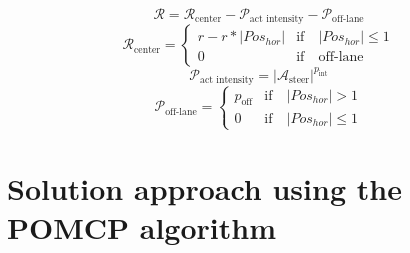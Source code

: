 

\begin{equation*}
    \mathcal{R} = \mathcal{R}_{\textrm{center}} - \mathcal{P}_{\textrm{act intensity}} - \mathcal{P}_{\textrm{off-lane}}
\end{equation*}
\begin{equation*}
    \mathcal{R}_{\textrm{center}} = 
    \begin{cases}
        r - r * |Pos_{hor}| & \text{if} \quad |Pos_{hor}| \leq 1 \\
        0 & \text{if} \quad \text{off-lane}
    \end{cases}
\end{equation*}
\begin{equation*}
    \mathcal{P}_{\textrm{act intensity}} = |\mathcal{A}_{\textrm{steer}}| ^ {p_{\textrm{int}}}
\end{equation*}
\begin{equation*}
    \mathcal{P}_{\textrm{off-lane}} = 
    \begin{cases}
        p_{\textrm{off}} & \text{if} \quad |Pos_{hor}| > 1 \\
        0 & \text{if} \quad |Pos_{hor}| \leq 1
    \end{cases}
\end{equation*}

\section{Solution approach using the POMCP algorithm}
